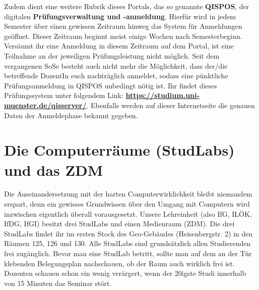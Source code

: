 Zudem dient eine weitere Rubrik dieses Portals, das so genannte \textbf{QISPOS}, der digitalen \textbf{Prüfungsverwaltung und -anmeldung}. Hierfür wird in jedem Semester über einen gewissen Zeitraum hinweg das System für Anmeldungen geöffnet. Dieser Zeitraum beginnt meist einige Wochen nach Semesterbeginn. Versäumt ihr eine Anmeldung in diesem Zeitraum auf dem Portal, ist eine Teilnahme an der jeweiligen Prüfungsleistung nicht möglich. Seit dem vergangenen SoSe besteht auch nicht mehr die Möglichkeit, dass der/die betreffende DozentIn euch nachträglich anmeldet, sodass eine pünktliche Prüfungsanmeldung in QISPOS unbedingt nötig ist. Ihr ﬁndet dieses Prüfungssystem unter folgendem Link: \textbf{\url{https://studium.uni-muenster.de/qisserver/}}. Ebenfalls werden auf dieser Internetseite die genauen Daten der Anmeldephase bekannt gegeben.

\section*{Die Computerräume (StudLabs) und das ZDM}
Die Auseinandersetzung mit der harten Computerwirklichkeit bleibt niemandem erspart, denn ein gewisses Grundwissen über den Umgang mit Computern wird inzwischen eigentlich überall vorausgesetzt. Unsere Lehreinheit (also IfG, ILÖK, IfDG, IfGI) besitzt drei StudLabs und einen Medienraum (ZDM). Die drei StudLabs findet ihr im ersten Stock des Geo-Gebäudes (Heisenbergstr. 2) in den Räumen 125, 126 und 130. Alle StudLabs sind grundsätzlich allen Studierenden frei zugänglich. Bevor man eine StudLab betritt, sollte man auf dem an der Tür klebenden Belegungsplan nachschauen, ob der Raum auch wirklich frei ist. Dozenten schauen schon ein wenig verärgert, wenn der 20igste Studi innerhalb von 15 Minuten das Seminar stört.

